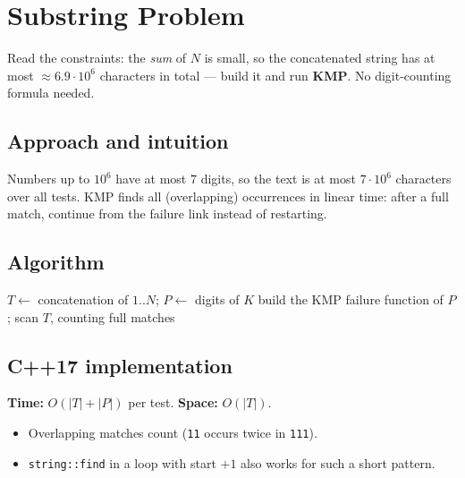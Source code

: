 \section{Substring Problem}
\label{sec:n-substring}


\begin{patternbox}
Read the constraints: the \emph{sum} of $N$ is small, so the concatenated
string has at most $\approx6.9\cdot10^6$ characters in total --- build it and
run \textbf{KMP}. No digit-counting formula needed.
\end{patternbox}

\subsection*{Approach and intuition}

Numbers up to $10^6$ have at most $7$ digits, so the text is at most
$7\cdot10^6$ characters over all tests. KMP finds all (overlapping) occurrences
in linear time: after a full match, continue from the failure link instead of
restarting.

\subsection*{Algorithm}
\begin{algorithmic}[1]
\State $T\gets$ concatenation of $1..N$; $P\gets$ digits of $K$
\State build the KMP failure function of $P$; scan $T$, counting full matches
\end{algorithmic}


\subsection*{C++17 implementation}

\begin{complexitybox}
\textbf{Time:} $O(|T|+|P|)$ per test. \textbf{Space:} $O(|T|)$.
\end{complexitybox}

\begin{pitfallbox}
\begin{itemize}
  \item Overlapping matches count (\texttt{11} occurs twice in
        \texttt{111}).
  \item \texttt{string::find} in a loop with start $+1$ also works for such a
        short pattern.
\end{itemize}
\end{pitfallbox}
